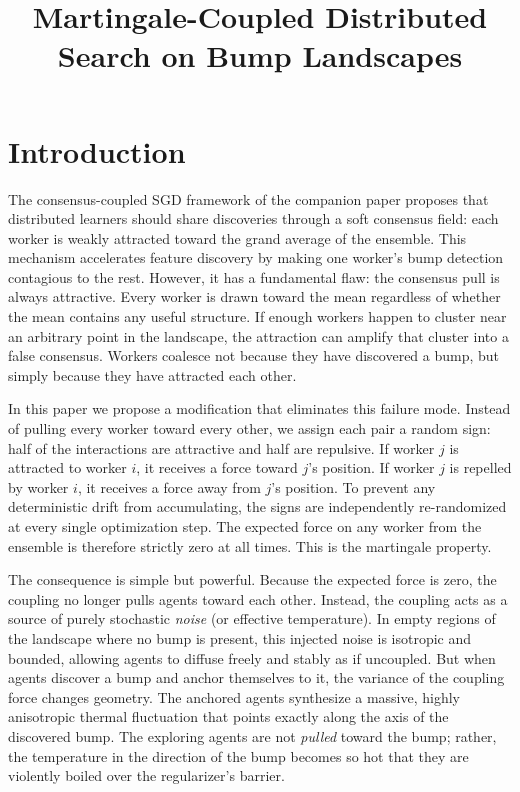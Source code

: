 \documentclass{article}
\title{Martingale-Coupled Distributed Search on Bump Landscapes}
\author{}
\date{}
\begin{document}
\maketitle

\section{Introduction}

The consensus-coupled SGD framework of the companion paper proposes that
distributed learners should share discoveries through a soft consensus
field: each worker is weakly attracted toward the grand average of the
ensemble. This mechanism accelerates feature discovery by making one
worker's bump detection contagious to the rest. However, it has a
fundamental flaw: the consensus pull is always attractive. Every worker is
drawn toward the mean regardless of whether the mean contains any useful
structure. If enough workers happen to cluster near an arbitrary point in
the landscape, the attraction can amplify that cluster into a false
consensus. Workers coalesce not because they have discovered a bump, but
simply because they have attracted each other.

In this paper we propose a modification that eliminates this failure mode.
Instead of pulling every worker toward every other, we assign each pair a
random sign: half of the interactions are attractive and half are
repulsive. If worker $j$ is attracted to worker $i$, it receives a force
toward $j$'s position. If worker $j$ is repelled by worker $i$, it
receives a force away from $j$'s position. To prevent any deterministic
drift from accumulating, the signs are independently re-randomized at every single optimization step. The expected
force on any worker from the ensemble is therefore strictly zero at all times. This is the
martingale property.

The consequence is simple but powerful. Because the expected force is zero, the coupling no longer pulls agents toward each other. Instead, the coupling acts as a source of purely stochastic \emph{noise} (or effective temperature). In empty regions of the landscape where no bump is present, this injected noise is isotropic and bounded, allowing agents to diffuse freely and stably as if uncoupled. But when agents discover a bump and anchor themselves to it, the variance of the coupling force changes geometry. The anchored agents synthesize a massive, highly anisotropic thermal fluctuation that points exactly along the axis of the discovered bump. The exploring agents are not \emph{pulled} toward the bump; rather, the temperature in the direction of the bump becomes so hot that they are violently boiled over the regularizer's barrier. 
\end{document}
